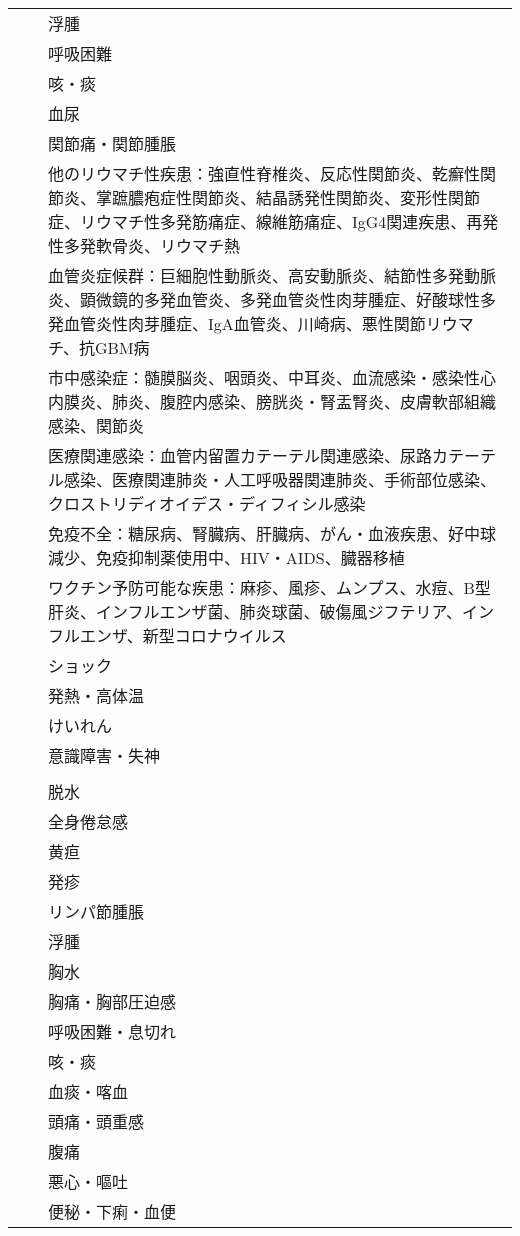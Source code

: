 \begin{xltabular}{\linewidth}{XXX}
 &  & 浮腫 \\
 &  & 呼吸困難 \\
 &  & 咳・痰 \\
 &  & 血尿 \\
 &  & 関節痛・関節腫脹 \\
 &  & 他のリウマチ性疾患：強直性脊椎炎、反応性関節炎、乾癬性関節炎、掌蹠膿疱症性関節炎、結晶誘発性関節炎、変形性関節症、リウマチ性多発筋痛症、線維筋痛症、IgG4関連疾患、再発性多発軟骨炎、リウマチ熱 \\
 &  & 血管炎症候群：巨細胞性動脈炎、高安動脈炎、結節性多発動脈炎、顕微鏡的多発血管炎、多発血管炎性肉芽腫症、好酸球性多発血管炎性肉芽腫症、IgA血管炎、川崎病、悪性関節リウマチ、抗GBM病 \\
 &  & 市中感染症：髄膜脳炎、咽頭炎、中耳炎、血流感染・感染性心内膜炎、肺炎、腹腔内感染、膀胱炎・腎盂腎炎、皮膚軟部組織感染、関節炎 \\
 &  & 医療関連感染：血管内留置カテーテル関連感染、尿路カテーテル感染、医療関連肺炎・人工呼吸器関連肺炎、手術部位感染、クロストリディオイデス・ディフィシル感染 \\
 &  & 免疫不全：糖尿病、腎臓病、肝臓病、がん・血液疾患、好中球減少、免疫抑制薬使用中、HIV・AIDS、臓器移植 \\
 &  & ワクチン予防可能な疾患：麻疹、風疹、ムンプス、水痘、B型肝炎、インフルエンザ菌、肺炎球菌、破傷風ジフテリア、インフルエンザ、新型コロナウイルス \\
 &  & ショック \\
 &  & 発熱・高体温 \\
 &  & けいれん \\
 &  & 意識障害・失神 \\
 &  &  \\
 &  & 脱水 \\
 &  & 全身倦怠感 \\
 &  & 黄疸 \\
 &  & 発疹 \\
 &  & リンパ節腫脹 \\
 &  & 浮腫 \\
 &  & 胸水 \\
 &  & 胸痛・胸部圧迫感 \\
 &  & 呼吸困難・息切れ \\
 &  & 咳・痰 \\
 &  & 血痰・喀血 \\
 &  & 頭痛・頭重感 \\
 &  & 腹痛 \\
 &  & 悪心・嘔吐 \\
 &  & 便秘・下痢・血便 \\

\end{xltabular}
